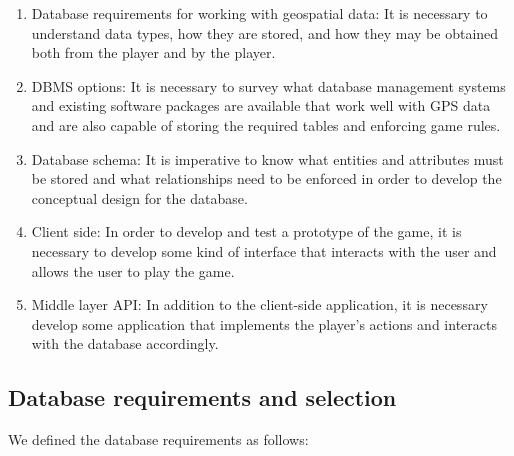 \documentclass[conference]{IEEEtran}
\begin{document}
\begin{enumerate}
	\item Database requirements for working with geospatial data: It is necessary to understand data types, how they are stored, and how they may be obtained both from the player and by the player. 
	\item DBMS options: It is necessary to survey what database management systems and existing software packages are available that work well with GPS data and are also capable of storing the required tables and enforcing game rules.
	\item Database schema: It is imperative to know what entities and attributes must be stored and what relationships need to be enforced in order to develop the conceptual design for the database.
	\item Client side: In order to develop and test a prototype of the game, it is necessary to develop some kind of interface that interacts with the user and allows the user to play the game.
	\item Middle layer API: In addition to the client-side application, it is necessary develop some application that implements the player’s actions and interacts with the database accordingly.

\end{enumerate}

\subsection{Database requirements and selection}

We defined the database requirements as follows:
\end{document}
